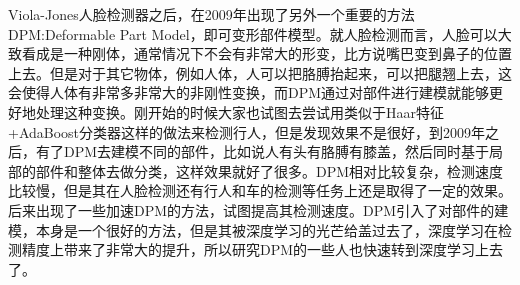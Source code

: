Viola-Jones人脸检测器之后，在2009年出现了另外一个重要的方法DPM:Deformable Part Model\cite{dpm}，即可变形部件模型。就人脸检测而言，人脸可以大致看成是一种刚体，通常情况下不会有非常大的形变，比方说嘴巴变到鼻子的位置上去。但是对于其它物体，例如人体，人可以把胳膊抬起来，可以把腿翘上去，这会使得人体有非常多非常大的非刚性变换，而DPM通过对部件进行建模就能够更好地处理这种变换。刚开始的时候大家也试图去尝试用类似于Haar特征+AdaBoost分类器这样的做法来检测行人，但是发现效果不是很好，到2009年之后，有了DPM去建模不同的部件，比如说人有头有胳膊有膝盖，然后同时基于局部的部件和整体去做分类，这样效果就好了很多。DPM相对比较复杂，检测速度比较慢，但是其在人脸检测还有行人和车的检测等任务上还是取得了一定的效果。后来出现了一些加速DPM的方法，试图提高其检测速度。DPM引入了对部件的建模，本身是一个很好的方法，但是其被深度学习的光芒给盖过去了，深度学习在检测精度上带来了非常大的提升，所以研究DPM的一些人也快速转到深度学习上去了。
